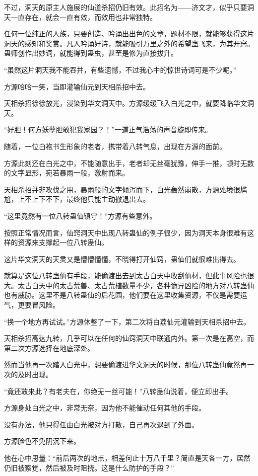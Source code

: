 \begin{this_body}
不过，洞天的原主人施展的仙道杀招仍旧有效。此招名为――济文才，似乎只要洞天一直存在，就会一直有效，而效用也非常独特。

任何一位纯正的人族，只要创造、吟诵出出色的文章，题材不限，就能够获得这片洞天的感知和奖赏。凡人吟诵好诗，就能吸引万里之外的希望蛊飞来，为其开窍。蛊师创作出妙词，就能得到蛊虫，甚至是修为直接拔升。

“虽然这片洞天我不能吞并，有些遗憾，不过我心中的惊世诗词可是不少呢。”

方源哈哈一笑，当即灌输仙元到天相杀招中去。

天相杀招徐徐放光，浸染到华文洞天中。方源缓缓飞入白光之中，就要降临华文洞天。

“好胆！何方妖孽胆敢犯我家园？！”一道正气浩荡的声音旋即传来。

随着，一位白袍书生形象的老者，携带着八转气息，出现在方源的面前。

方源此刻还在白光之中，不能随意出手，老者却无丝毫犹豫，伸手一推，顿时无数的文字显形，宛若暴雨一般，激射而来。

天相杀招并非攻伐之用，暴雨般的文字倾泻而下，白光轰然崩散，方源处境很尴尬，上不上下不下，最终他只能主动撤退出去。

“这里竟然有一位八转蛊仙镇守！”方源有些意外。

按照正常情况而言，仙窍洞天中出现八转蛊仙的例子很少，因为洞天本身很难有这样的资源来支撑起一位八转蛊仙。

这片华文洞天的天灵又是懵懵懂懂，不晓得打开仙窍，蛊仙们就很难出得去。

就算是这位八转蛊仙有手段，能偷渡出去到太古白天中收刮仙材，但此事风险也很大。太古白天中的太古荒兽、太古荒植数量不少，各种诡异凶险的地方对八转蛊仙也有威胁。这里不是八转蛊仙的后花园，他们要在这里收集资源，不仅是需要运气，更要冒风险。

“换一个地方再试试。”方源休整了一下，第二次将白荔仙元灌输到天相杀招中去。

天相杀招高达九转，几乎可以在任何的仙窍洞天中联通内外。第一次是在高空，而第二次方源选择在地底深处。

然而当他再一次踏入白光中，想要偷渡进华文洞天的时候，那位八转蛊仙竟然再一次的及时出现。

“竟还敢来此？有老夫在，你绝无一丝可能！”八转蛊仙说着，便立即出手。

方源身处白光之中，非常无奈，因为他不能催动任何其他的手段。

没有办法，他只得任由白光被对方打散，自己再次退到了外面。

方源脸色不免阴沉下来。

他在心中思量：“前后两次的地点，相差何止十万八千里？简直是天各一方，居然仍旧被察觉，然后被及时阻挠。这是什么防护的手段？”


\end{this_body}
